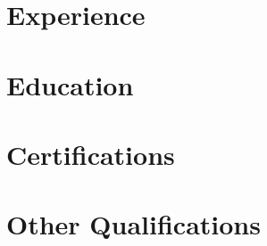 \section{Experience}
    \experience
        
\section{Education}
    \education
    
\section{Certifications}
    \certifications

\section{Other Qualifications}
    \otherqualifications %


